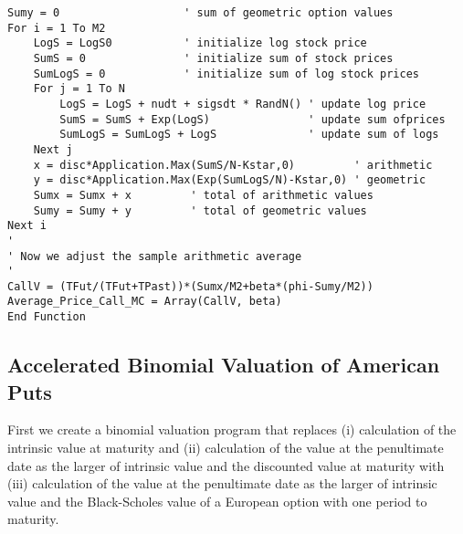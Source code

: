 \begin{verbatim}
Sumy = 0                   ' sum of geometric option values
For i = 1 To M2
    LogS = LogS0           ' initialize log stock price
    SumS = 0               ' initialize sum of stock prices
    SumLogS = 0            ' initialize sum of log stock prices
    For j = 1 To N
        LogS = LogS + nudt + sigsdt * RandN() ' update log price
        SumS = SumS + Exp(LogS)               ' update sum ofprices
        SumLogS = SumLogS + LogS              ' update sum of logs
    Next j
    x = disc*Application.Max(SumS/N-Kstar,0)         ' arithmetic
    y = disc*Application.Max(Exp(SumLogS/N)-Kstar,0) ' geometric
    Sumx = Sumx + x         ' total of arithmetic values
    Sumy = Sumy + y         ' total of geometric values
Next i
'
' Now we adjust the sample arithmetic average
'
CallV = (TFut/(TFut+TPast))*(Sumx/M2+beta*(phi-Sumy/M2))
Average_Price_Call_MC = Array(CallV, beta)
End Function
\end{verbatim}\normalsize


\subsection*{Accelerated Binomial Valuation of American Puts}

First we create a binomial valuation program that replaces (i) calculation of the intrinsic value at maturity and (ii) calculation of the value at the penultimate date as the larger of intrinsic value and the discounted value at maturity with (iii) calculation of the value at the penultimate date as the larger of intrinsic value and the Black-Scholes value of a European option with one period to maturity.

